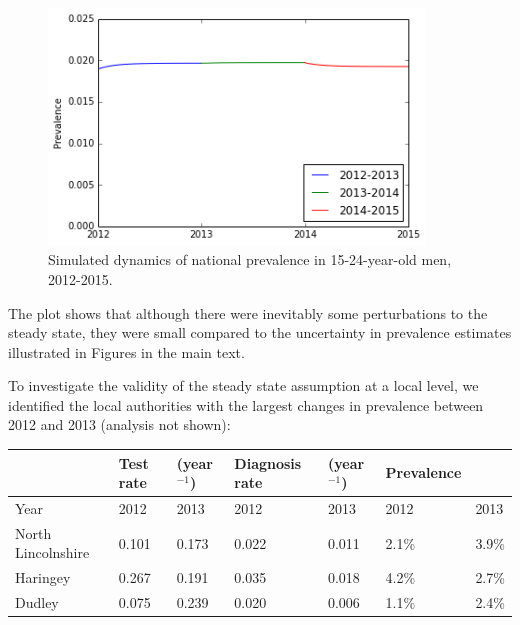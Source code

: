 \documentclass{article}
\begin{document}
    \begin{figure}
        \begin{center}\includegraphics[width=10cm]{three_compartment_model_files/three_compartment_model_17_1.png}\end{center}
        \caption{Simulated dynamics of national prevalence in 15-24-year-old men, 2012-2015.}
        \label{}
    \end{figure}
    
    The plot shows that although there were inevitably some perturbations to
the steady state, they were small compared to the uncertainty in
prevalence estimates illustrated in Figures in the main text.

To investigate the validity of the steady state assumption at a local
level, we identified the local authorities with the largest changes in
prevalence between 2012 and 2013 (analysis not shown):

\begin{longtable}[c]{@{}lllllll@{}}
\toprule
& Test rate & (year\(^{-1}\)) & Diagnosis rate & (year\(^{-1}\)) &
Prevalence &\tabularnewline
\midrule
\endhead
Year & 2012 & 2013 & 2012 & 2013 & 2012 & 2013\tabularnewline
North Lincolnshire & 0.101 & 0.173 & 0.022 & 0.011 & 2.1\% &
3.9\%\tabularnewline
Haringey & 0.267 & 0.191 & 0.035 & 0.018 & 4.2\% & 2.7\%\tabularnewline
Dudley & 0.075 & 0.239 & 0.020 & 0.006 & 1.1\% & 2.4\%\tabularnewline
\bottomrule
\end{longtable}
\end{document}

